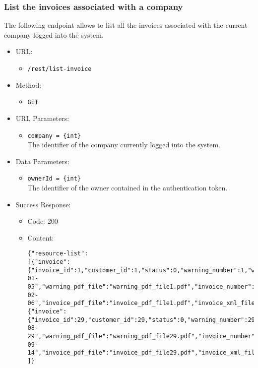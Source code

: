 \newpage
\subsubsection*{List the invoices associated with a company}

The following endpoint allows to list all the invoices associated with the current company logged into the system.

\begin{itemize}

    \item URL:
    \begin{itemize}
        \item \texttt{/rest/list-invoice}
    \end{itemize}

    \item Method:
    \begin{itemize}
        \item \texttt{GET}
    \end{itemize}

    \item URL Parameters:
    \begin{itemize}
        \item \texttt{company = \{int\}} \\
        The identifier of the company currently logged into the system.
    \end{itemize}

    \item Data Parameters:
    \begin{itemize}
        \item \texttt{ownerId = \{int\}} \\
        The identifier of the owner contained in the authentication token.
    \end{itemize}

    \item Success Response:
    \begin{itemize}
        \item Code: 200
        \item Content:
        \begin{lstlisting}
{"resource-list":
[{"invoice":{"invoice_id":1,"customer_id":1,"status":0,"warning_number":1,"warning_date":"2022-01-05","warning_pdf_file":"warning_pdf_file1.pdf","invoice_number":"1","invoice_date":"2022-02-06","invoice_pdf_file":"invoice_pdf_file1.pdf","invoice_xml_file":"invoice_xml_file1.xml","total":168.3,"discount":15.0,"pension_fund_refund":4.1,"has_stamp":false}},
{"invoice":{"invoice_id":29,"customer_id":29,"status":0,"warning_number":29,"warning_date":"2022-08-29","warning_pdf_file":"warning_pdf_file29.pdf","invoice_number":"29","invoice_date":"2022-09-14","invoice_pdf_file":"invoice_pdf_file29.pdf","invoice_xml_file":"invoice_xml_file29.xml","total":846.8,"discount":75.4,"pension_fund_refund":1.2,"has_stamp":false}}
]}
        \end{lstlisting}
    \end{itemize}


\end{itemize}
